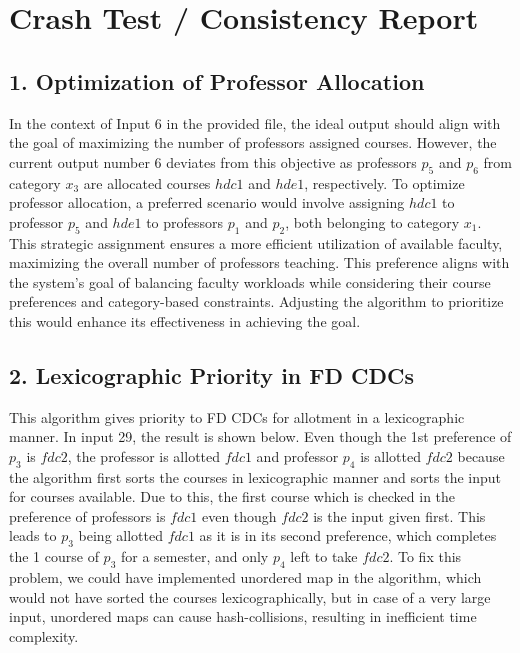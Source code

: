 \documentclass{article}
\begin{document}
\section*{Crash Test / Consistency Report}

\subsection*{1. Optimization of Professor Allocation}

In the context of Input 6 in the provided file, the ideal output should align with the goal of maximizing the number of professors assigned courses. However, the current output number 6 deviates from this objective as professors $p_5$ and $p_6$ from category $x_3$ are allocated courses $hdc1$ and $hde1$, respectively. To optimize professor allocation, a preferred scenario would involve assigning $hdc1$ to professor $p_5$ and $hde1$ to professors $p_1$ and $p_2$, both belonging to category $x_1$. This strategic assignment ensures a more efficient utilization of available faculty, maximizing the overall number of professors teaching. This preference aligns with the system's goal of balancing faculty workloads while considering their course preferences and category-based constraints. Adjusting the algorithm to prioritize this would enhance its effectiveness in achieving the goal.

\subsection*{2. Lexicographic Priority in FD CDCs}

This algorithm gives priority to FD CDCs for allotment in a lexicographic manner. In input 29, the result is shown below. Even though the 1st preference of $p_3$ is $fdc2$, the professor is allotted $fdc1$ and professor $p_4$ is allotted $fdc2$ because the algorithm first sorts the courses in lexicographic manner and sorts the input for courses available. Due to this, the first course which is checked in the preference of professors is $fdc1$ even though $fdc2$ is the input given first. This leads to $p_3$ being allotted $fdc1$ as it is in its second preference, which completes the 1 course of $p_3$ for a semester, and only $p_4$ left to take $fdc2$. To fix this problem, we could have implemented unordered map in the algorithm, which would not have sorted the courses lexicographically, but in case of a very large input, unordered maps can cause hash-collisions, resulting in inefficient time complexity.
\end{document}
